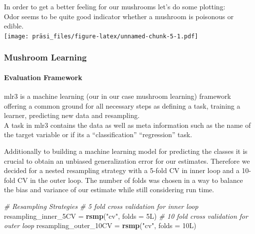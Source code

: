 \documentclass[
]{article}
\newenvironment{Shaded}{\begin{snugshade}}{\end{snugshade}}
\newcommand{\CommentTok}[1]{\textcolor[rgb]{0.56,0.35,0.01}{\textit{#1}}}
\newcommand{\DataTypeTok}[1]{\textcolor[rgb]{0.13,0.29,0.53}{#1}}
\newcommand{\KeywordTok}[1]{\textcolor[rgb]{0.13,0.29,0.53}{\textbf{#1}}}
\newcommand{\NormalTok}[1]{#1}
\newcommand{\OperatorTok}[1]{\textcolor[rgb]{0.81,0.36,0.00}{\textbf{#1}}}
\newcommand{\StringTok}[1]{\textcolor[rgb]{0.31,0.60,0.02}{#1}}
\let\oldparagraph\paragraph
\renewcommand{\paragraph}[1]{\oldparagraph{#1}\mbox{}}
\begin{document}
In order to get a better feeling for our mushrooms let's do some
plotting:\\
Odor seems to be quite good indicator whether a mushroom is poisonous or
edible.\\
\texttt{[image: präsi\_files/figure-latex/unnamed-chunk-5-1.pdf]}

\hypertarget{mushroom-learning}{%
\subsubsection{Mushroom Learning}\label{mushroom-learning}}

\hypertarget{evaluation-framework}{%
\paragraph{Evaluation Framework}\label{evaluation-framework}}

mlr3 is a machine learning (our in our case mushroom learning) framework
offering a common ground for all necessary steps as defining a task,
training a learner, predicting new data and resampling.\\
A task in mlr3 contains the data as well as meta information such as the
name of the target variable or if its a ``classification''
``regression'' task.

\begin{Shaded}
\end{Shaded}

Additionally to building a machine learning model for predicting the
classes it is crucial to obtain an unbiased generalization error for our
estimates. Therefore we decided for a nested resampling strategy with a
5-fold CV in inner loop and a 10-fold CV in the outer loop. The number
of folds was chosen in a way to balance the bias and variance of our
estimate while still considering run time.

\begin{Shaded}
\begin{Highlighting}[]
\CommentTok{# Resampling Strategies }
\CommentTok{# 5 fold cross validation for inner loop}
\NormalTok{resampling_inner_5CV =}\StringTok{ }\KeywordTok{rsmp}\NormalTok{(}\StringTok{"cv"}\NormalTok{, }\DataTypeTok{folds =}\NormalTok{ 5L)}
\CommentTok{# 10 fold cross validation for outer loop}
\NormalTok{resampling_outer_10CV =}\StringTok{ }\KeywordTok{rsmp}\NormalTok{(}\StringTok{"cv"}\NormalTok{, }\DataTypeTok{folds =}\NormalTok{ 10L)}
\end{Highlighting}
\end{Shaded}
\end{document}
